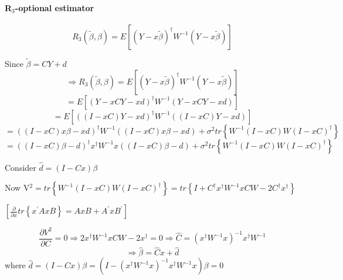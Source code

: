 \documentclass{article}
\begin{document}
\bigskip

\paragraph{R$_{3}$-optional estimator}

\begin{equation*}
R_{3}\left( \tilde{\beta},\beta \right) =E\left[ \left( Y-x\tilde{\beta}%
\right) ^{\dagger }W^{-1}\left( Y-x\tilde{\beta}\right) \right]
\end{equation*}

Since $\tilde{\beta}=CY+d$%
\begin{equation*}
\Rightarrow R_{3}\left( \tilde{\beta},\beta \right) =E\left[ \left( Y-x%
\tilde{\beta}\right) ^{\dagger }W^{-1}\left( Y-x\tilde{\beta}\right) \right]
\end{equation*}%
\begin{equation*}
=E\left[ \left( Y-xCY-xd\right) ^{\dagger }W^{-1}\left( Y-xCY-xd\right) %
\right]
\end{equation*}%
\begin{equation*}
=E\left[ \left( \left( I-xC\right) Y-xd\right) ^{\dagger }W^{-1}\left(
\left( I-xC\right) Y-xd\right) \right]
\end{equation*}%
\begin{equation*}
=\left( \left( I-xC\right) x\beta -xd\right) ^{\dagger }W^{-1}\left( \left(
I-xC\right) x\beta -xd\right) +\sigma ^{2}tr\left\{ W^{-1}\left( I-xC\right)
W\left( I-xC\right) ^{\dagger }\right\}
\end{equation*}%
\begin{equation*}
=\left( \left( I-xC\right) \beta -d\right) ^{\dagger }x^{\dagger
}W^{-1}x\left( \left( I-xC\right) \beta -d\right) +\sigma ^{2}tr\left\{
W^{-1}\left( I-xC\right) W\left( I-xC\right) ^{\dagger }\right\}
\end{equation*}

Consider $\hat{d}=\left( I-Cx\right) \beta $

Now V$^{2}=tr\left\{ W^{-1}\left( I-xC\right) W\left( I-xC\right) ^{\dagger
}\right\} =tr\left\{ I+C^{\dagger }x^{\dagger }W^{-1}xCW-2C^{\dagger
}x^{\dagger }\right\} $

$\left[ \frac{\partial }{\partial x}tr\left\{ x^{\prime }AxB\right\}
=AxB+A^{\prime }xB^{\prime }\right] $

\begin{equation*}
\frac{\partial V^{2}}{\partial C}=0\Rightarrow 2x^{\dagger
}W^{-1}xCW-2x^{\dagger }=0\Rightarrow \hat{C}=\left( x^{\dagger
}W^{-1}x\right) ^{-1}x^{\dagger }W^{-1}
\end{equation*}%
\begin{equation*}
\Rightarrow \hat{\beta}=\hat{C}x+\hat{d}
\end{equation*}%
where $\hat{d}=\left( I-Cx\right) \beta =\left( I-\left( x^{\dagger
}W^{-1}x\right) ^{-1}x^{\dagger }W^{-1}x\right) \beta =0$
\end{document}
